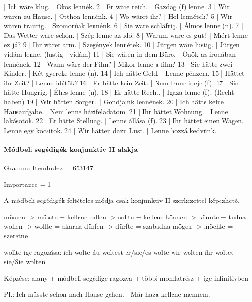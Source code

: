 \documentclass{article}
\newenvironment{desc}{\verbatim}{\endverbatim}
\newenvironment{exmp}{\verbatim}{\endverbatim}
\begin{document}
\begin{exmp}
1 | Ich wäre klug. | Okos lennék.
2 | Er wäre reich. | Gazdag (f) lenne.
3 | Wir wären zu Hause. | Otthon lennénk.
4 | Wo wäret ihr? | Hol lennétek?
5 | Wir wären traurig. | Szomorúak lennénk.
6 | Sie wäre schläfrig. | Álmos lenne (n).
7 | Das Wetter wäre schön. | Szép lenne az idő.
8 | Warum wäre es gut? | Miért lenne ez jó?
9 | Ihr wäret arm. | Szegények lennétek.
10 | Jürgen wäre lustig. | Jürgen vidám lenne. (lustig - vidám)
11 | Sie wären in dem Büro. | Önök az irodában lennének.
12 | Wann wäre der Film? | Mikor lenne a film?
13 | Sie hätte zwei Kinder. | Két gyereke lenne (n).
14 | Ich hätte Geld. | Lenne pénzem.
15 | Hättet ihr Zeit? | Lenne időtök?
16 | Er hätte kein Zeit. | Nem lenne ideje (f).
17 | Sie hätte Hungrig. | Éhes lenne (n).
18 | Er hätte Recht. | Igaza lenne (f). (Recht haben)
19 | Wir hätten Sorgen. | Gondjaink lennének.
20 | Ich hätte keine Hausaufgabe. | Nem lenne házifeladatom.
21 | Ihr hättet Wohnung. | Lenne lakásotok.
22 | Er hätte Stellung. | Lenne állása (f).
23 | Ihr hättet einen Wagen. | Lenne egy kocsitok.
24 | Wir hätten dazu Lust. | Lenne hozzá kedvünk.
\end{exmp}

\paragraph{Módbeli segédigék konjunktív II alakja}

GrammarItemIndex = 653147

Importance = 1

\begin{desc}
A módbeli segédigék feltételes módja csak konjunktiv II szerkezettel képezhető.

müssen -> müsste = kellene
sollen -> sollte = kellene
können -> könnte = tudna
wollen -> wollte = akarna
dürfen -> dürfte = szabadna
mögen -> möchte = szeretne

wollte ige ragozása:
ich wolte
du woltest
er/sie/es wolte
wir wolten
ihr woltet
sie/Sie wolten

Képzése: alany + módbeli segédige ragozva + többi mondatrész + ige infinitivben

Pl.: Ich müsste schon nach Hause gehen. - Már haza kellene mennem.
\end{desc}
\end{document}
